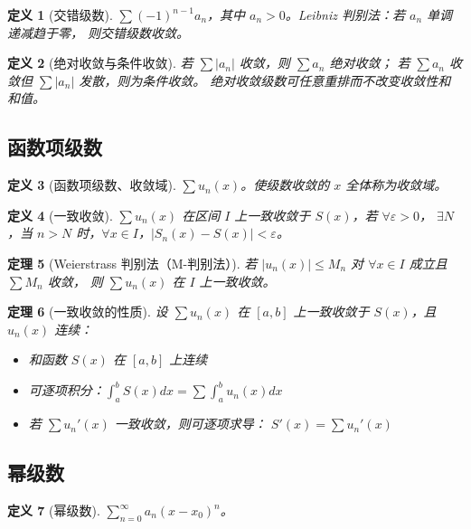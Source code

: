 \documentclass[12pt,a4paper]{ctexart}
\newtheorem{theorem}{定理}[section]
\newtheorem{definition}[theorem]{定义}
\theoremstyle{remark}
\begin{document}
\begin{definition}[交错级数]
$\sum (-1)^{n-1} a_n$，其中 $a_n > 0$。Leibniz 判别法：若 $a_n$ 单调递减趋于零，
则交错级数收敛。
\end{definition}

\begin{definition}[绝对收敛与条件收敛]
若 $\sum |a_n|$ 收敛，则 $\sum a_n$ 绝对收敛；
若 $\sum a_n$ 收敛但 $\sum |a_n|$ 发散，则为条件收敛。
绝对收敛级数可任意重排而不改变收敛性和和值。
\end{definition}

\subsection{函数项级数}

\begin{definition}[函数项级数、收敛域]
$\sum u_n(x)$。使级数收敛的 $x$ 全体称为收敛域。
\end{definition}

\begin{definition}[一致收敛]
$\sum u_n(x)$ 在区间 $I$ 上一致收敛于 $S(x)$，若 $\forall \varepsilon>0$，
$\exists N$，当 $n>N$ 时，$\forall x \in I$，$|S_n(x)-S(x)|<\varepsilon$。
\end{definition}

\begin{theorem}[Weierstrass 判别法（M-判别法）]
若 $|u_n(x)| \le M_n$ 对 $\forall x \in I$ 成立且 $\sum M_n$ 收敛，
则 $\sum u_n(x)$ 在 $I$ 上一致收敛。
\end{theorem}

\begin{theorem}[一致收敛的性质]
设 $\sum u_n(x)$ 在 $[a,b]$ 上一致收敛于 $S(x)$，且 $u_n(x)$ 连续：
\begin{itemize}
  \item 和函数 $S(x)$ 在 $[a,b]$ 上连续
  \item 可逐项积分：$\int_a^b S(x)dx = \sum \int_a^b u_n(x)dx$
  \item 若 $\sum u_n'(x)$ 一致收敛，则可逐项求导：
    $S'(x) = \sum u_n'(x)$
\end{itemize}
\end{theorem}

\subsection{幂级数}

\begin{definition}[幂级数]
$\sum_{n=0}^{\infty} a_n (x-x_0)^n$。
\end{definition}
\end{document}
